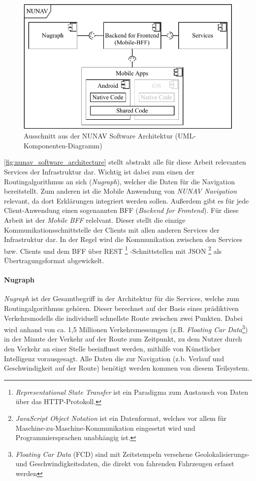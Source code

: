 \begin{figure}[htb!]
    \centering
    \includegraphics[width=\textwidth]{contents/06_model_evaluation/01_integration/res/nunav_architecture.pdf}
    \caption{Ausschnitt aus der NUNAV Software Architektur (UML-Komponenten-Diagramm)}
    \label{fig:nunav_software_architecture}
\end{figure}

\autoref{fig:nunav_software_architecture} stellt abstrakt alle für diese Arbeit relevanten Services der Infrastruktur dar. Wichtig ist dabei zum einen der Routingalgorithmus an sich (\textit{Nugraph}), welcher die Daten für die Navigation bereitstellt. Zum anderen ist die Mobile Anwendung von \textit{NUNAV Navigation} relevant, da dort Erklärungen integriert werden sollen. Außerdem gibt es für jede Client-Anwendung einen sogenannten BFF (\textit{Backend for Frontend}). Für diese Arbeit ist der \textit{Mobile BFF} relelvant. Dieser stellt die einzige Kommunikationsschnittstelle der Clients mit allen anderen Services der Infrastruktur dar. In der Regel wird die Kommunikation zwischen den Services bzw. Clients und dem BFF über REST
\footnote{\textit{Representational State Transfer} ist ein Paradigma zum Austausch von Daten über das HTTP-Protokoll.}
-Schnittstellen mit JSON
\footnote{\textit{JavaScript Object Notation} ist ein Datenformat, welches vor allem für Maschine-zu-Maschine-Kommunikation eingesetzt wird und Programmiersprachen unabhängig ist.}
als Übertragungsformat abgewickelt. 

\paragraph{Nugraph} \textit{Nugraph} ist der Gesamtbegriff in der Architektur für die Services, welche zum Routingalgorithmus gehören. Dieser berechnet auf der Basis eines prädiktiven Verkehrsmodells die individuell schnellste Route zwischen zwei Punkten. Dabei wird anhand von ca. 1,5 Millionen Verkehrsmessungen
 (z.B. \textit{Floating Car Data}\footnote{\textit{Floating Car Data} (FCD) sind mit Zeitstempeln versehene Geolokalisierungs- und Geschwindigkeitsdaten, die direkt von fahrenden Fahrzeugen erfasst werden})
 in der Minute der Verkehr auf der Route zum Zeitpunkt, zu dem Nutzer durch den Verkehr an einer Stelle beeinflusst werden, mithilfe von Künstlicher Intelligenz vorausgesagt. Alle Daten die zur Navigation (z.b. Verlauf und Geschwindigkeit auf der Route) benötigt werden kommen von diesem Teilsystem.

